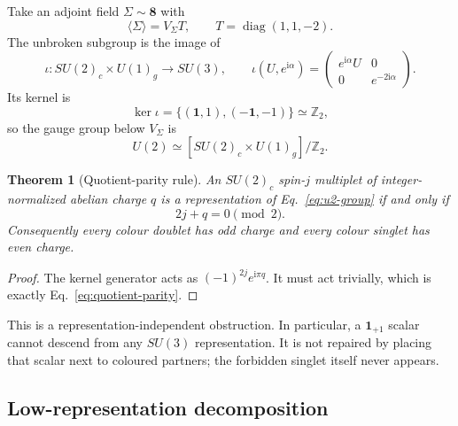 \documentclass[11pt]{article}
\newtheorem{theorem}{Theorem}[section]
\theoremstyle{definition}
\theoremstyle{remark}
\newcommand{\ii}{\mathrm i}
\newcommand{\ZZ}{\mathbb Z}
\begin{document}
Take an adjoint field \(\Sigma\sim\bm8\) with
\begin{equation}
 \langle\Sigma\rangle=V_\Sigma T,
 \qquad T=\operatorname{diag}(1,1,-2).
 \label{eq:adjoint-vev}
\end{equation}
The unbroken subgroup is the image of
\begin{equation}
 \iota:SU(2)_c\times U(1)_g\longrightarrow SU(3),
 \qquad
 \iota(U,e^{\ii\alpha})
 =\begin{pmatrix}e^{\ii\alpha}U&0\\0&e^{-2\ii\alpha}\end{pmatrix}.
 \label{eq:embedding-map}
\end{equation}
Its kernel is
\begin{equation}
 \ker\iota=\{(\bm1,1),(-\bm1,-1)\}\simeq\ZZ_2,
 \label{eq:embedding-kernel}
\end{equation}
so the gauge group below \(V_\Sigma\) is
\begin{equation}
 U(2)\simeq[SU(2)_c\times U(1)_g]/\ZZ_2.
 \label{eq:u2-group}
\end{equation}

\begin{theorem}[Quotient-parity rule]
An \(SU(2)_c\) spin-\(j\) multiplet of integer-normalized abelian charge
\(q\) is a representation of Eq.~\eqref{eq:u2-group} if and only if
\begin{equation}
 2j+q=0\pmod2.
 \label{eq:quotient-parity}
\end{equation}
Consequently every colour doublet has odd charge and every colour singlet has
even charge.
\end{theorem}
\begin{proof}
The kernel generator acts as
\((-1)^{2j}e^{\ii\pi q}\).  It must act trivially, which is exactly
Eq.~\eqref{eq:quotient-parity}.
\end{proof}

This is a representation-independent obstruction.  In particular, a
\(\bm1_{+1}\) scalar cannot descend from any \(SU(3)\) representation.  It is
not repaired by placing that scalar next to coloured partners; the forbidden
singlet itself never appears.

\subsection{Low-representation decomposition}
\end{document}
